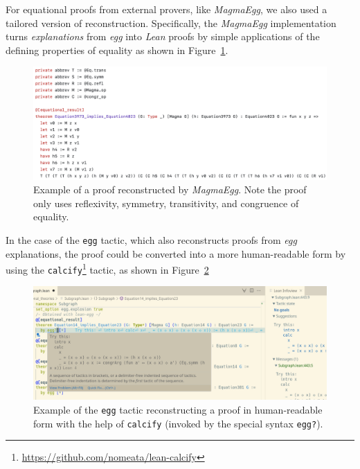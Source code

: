 
For equational proofs from external provers, like \emph{MagmaEgg}, we also used a tailored version of reconstruction.
Specifically, the \emph{MagmaEgg} implementation turns \emph{explanations} \cite{nieuwenhuis2005proof} from \emph{egg} into \emph{Lean} proofs by simple applications of the defining properties of equality as shown in Figure~\ref{fig:magma-egg-example}.

\begin{figure}
  \centering
  \includegraphics[width=\textwidth]{magma-egg-example.png}
  \caption{Example of a proof reconstructed by \emph{MagmaEgg}. Note the proof only uses reflexivity, symmetry, transitivity, and congruence of equality.}
  \label{fig:magma-egg-example}
\end{figure}

In the case of the \texttt{egg} tactic, which also reconstructs proofs from \emph{egg} explanations, the proof could be converted into a more human-readable form by using the \texttt{calcify}\footnote{\url{https://github.com/nomeata/lean-calcify}} tactic, as shown in Figure~\ref{fig:egg-example}

\begin{figure}
  \centering
  \includegraphics[width=\textwidth]{egg-example.png}
  \caption{Example of the \texttt{egg} tactic reconstructing a proof in human-readable form with the help of \texttt{calcify} (invoked by the special syntax \texttt{egg?}).}
  \label{fig:egg-example}
\end{figure}

